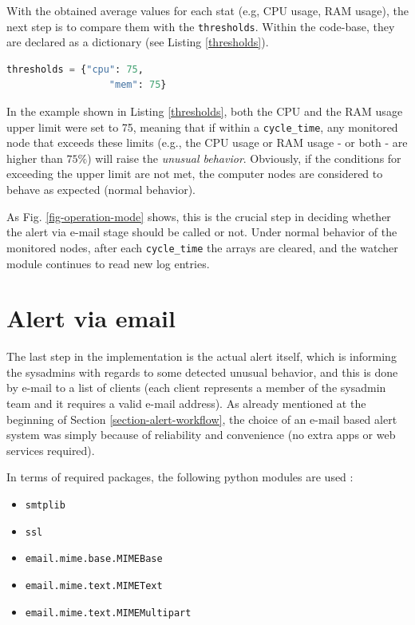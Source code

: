 \documentclass[conference]{IEEEtran}
\begin{document}
With the obtained average values for each stat (e.g, CPU usage, RAM usage), the next step is to compare them with the \texttt{thresholds}. Within the code-base, they are declared as a dictionary (see Listing \ref{thresholds}).

\begin{lstlisting}[language=Python, caption=Declaration of some thresholds within the code-base.,basicstyle=\footnotesize,label={thresholds}]
    thresholds = {"cpu": 75,
                  "mem": 75}
\end{lstlisting}

In the example shown in Listing \ref{thresholds}, both the CPU and the RAM usage upper limit were set to 75, meaning that if within a \texttt{cycle\_time}, any monitored node that exceeds these limits (e.g., the CPU usage or RAM usage - or both - are higher than $75\%$)  will raise the \emph{unusual behavior}. Obviously, if the conditions for exceeding the upper limit are not met, the computer nodes are considered to behave as expected (normal behavior).
\par As Fig. \ref{fig-operation-mode} shows, this is the crucial step in deciding whether the alert via e-mail stage should be called or not. Under normal behavior of the monitored nodes, after each \texttt{cycle\_time} the arrays are cleared, and the watcher module continues to read new log entries.

\section{Alert via email}
\label{section-email-alert}

The last step in the implementation is the actual alert itself, which is informing the sysadmins with regards to some detected unusual behavior, and this is done by e-mail to a list of clients (each client represents a member of the sysadmin team and it requires a valid e-mail address). As already mentioned at the beginning of Section \ref{section-alert-workflow}, the choice of an e-mail based alert system was simply because of reliability and convenience (no extra apps or web services required).
\par In terms of required packages, the following python modules are used \cite{emails}:
\begin{itemize}
    \item \texttt{smtplib}
    \item \texttt{ssl}
    \item \texttt{email.mime.base.MIMEBase}
    \item \texttt{email.mime.text.MIMEText}
    \item \texttt{email.mime.text.MIMEMultipart}
\end{itemize}
\end{document}
